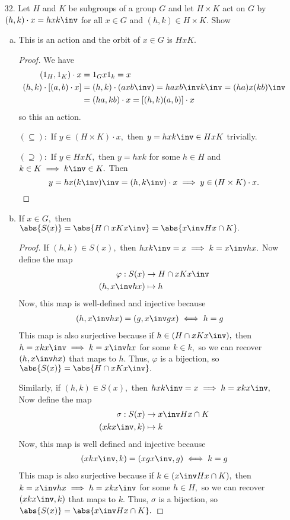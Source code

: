 \documentclass{article}
\begin{document}
\begin{itemize}
\begin{enumerate}[(a)]
		\end{enumerate}

	\item[32.] Let $H$ and $K$ be subgroups of a group $G$ and let $H\times K$ act on $G$ by $(h, k)\cdot x = hxk\inv$ for all $x\in G$ and $(h, k)\in H\times K.$ Show
		\begin{enumerate}[(a)]
			\item This is an action and the orbit of $x\in G$ is $HxK.$
				\begin{proof}
					We have
					\begin{align*}
						(1_H, 1_K) \cdot x &= 1_Gx1_k=x \\
						(h, k)\cdot \left[ (a, b)\cdot x \right] &= (h, k) \cdot (axb\inv) = haxb\inv k\inv = (ha)x(kb)\inv \\
						&= (ha, kb)\cdot x = \left[ (h, k)(a, b) \right]\cdot x
					\end{align*}
					so this an action. 

					$(\subseteq):$ If $y\in (H\times K)\cdot x,$ then $y=hxk\inv\in HxK$ trivially.

					$(\supseteq):$ If $y\in HxK,$ then $y=hxk$ for some $h\in H$ and $k\in K\implies k\inv\in K.$ Then 
					\[y=hx(k\inv)\inv = (h, k\inv)\cdot x\implies y\in (H\times K)\cdot x.\]
				\end{proof}

			\item If $x\in G,$ then $\abs{S(x)}=\abs{H\cap xKx\inv} =  \abs{x\inv Hx\cap K}.$
				\begin{proof}
					If $(h, k)\in S(x),$ then $hxk\inv = x\implies k=x\inv hx.$ Now define the map
					\begin{align*}
						\varphi:S(x) &\to H\cap xKx\inv \\
						(h, x\inv hx) &\mapsto h
					\end{align*}
					Now, this map is well-defined and injective because
					\begin{align*}
						(h, x\inv hx) = (g, x\inv gx) &\iff h = g
					\end{align*}
					This map is also surjective because if $h\in (H\cap xKx\inv),$ then $h=xkx\inv\implies k=x\inv hx$ for some $k\in k,$ so we can recover $(h, x\inv hx)$ that maps to $h.$ Thus, $\varphi$ is a bijection, so $\abs{S(x)} = \abs{H\cap xKx\inv}.$

					Similarly, if $(h, k)\in S(x),$ then $hxk\inv=x\implies h=xkx\inv,$ Now define the map
					\begin{align*}
						\sigma:S(x)&\to x\inv Hx\cap K \\
						(xkx\inv, k) &\mapsto k
					\end{align*}
					Now, this map is well defined and injective because
					\begin{align*}
						(xkx\inv, k) = (xgx\inv, g) \iff k=g
					\end{align*}
					This map is also surjective because if $k\in (x\inv Hx\cap K),$ then $k=x\inv hx\implies h=xkx\inv$ for some $h\in H,$ so we can recover $(xkx\inv, k)$ that maps to $k.$ Thus, $\sigma$ is a bijection, so $\abs{S(x)}=\abs{x\inv Hx \cap K}.$
				\end{proof}


\end{enumerate}
\end{itemize}
\end{document}
